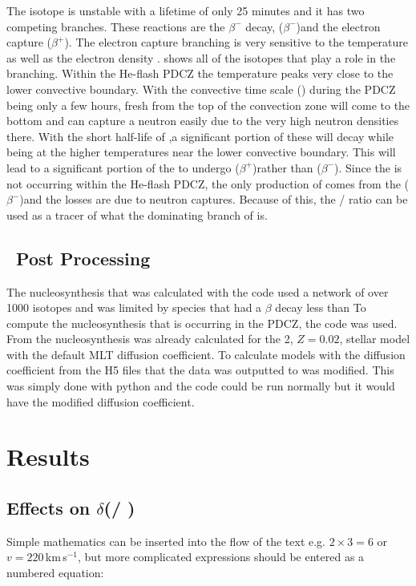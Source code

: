 \documentclass[fleqn,usenatbib]{mnras}
\begin{document}
The \iodine[128] isotope is unstable with a lifetime of only 25 minutes and it has two competing branches. These reactions are the $\beta^{-}$ decay, \iodine[128]($\beta^{-}$)\xenon[128] and the electron capture \iodine[128]($\beta^{+}$)\tellurium[128]. The electron capture branching is very sensitive to the temperature as well as the electron density \citep{reif}.  shows all of the isotopes that play a role in the \iodine[128] branching. Within the He-flash PDCZ the temperature peaks very close to the lower convective boundary. With the convective time scale () during the PDCZ being only a few hours, fresh \iodine[126] from the top of the convection zone will come to the bottom and can capture a neutron easily due to the very high neutron densities there. With the short half-life of \iodine[128],a significant portion of these will decay while being at the higher temperatures near the lower convective boundary. This will lead to a significant portion of the \iondine[128] to undergo \iodine[128]($\beta^{+}$)\tellurium[128] rather than \iodine[128]($\beta^{-}$)\xenon[128]. Since the \ppr is not occurring within the He-flash PDCZ, the only production of \xenon[128] comes from the \iodine[128]($\beta^{-}$)\xenon[128] and the losses are due to neutron captures. Because of this, the \xenon[128] / \xenon[130] ratio can be used as a tracer of what the dominating branch of \iodine[128] is.

\subsection{\mppnp~Post Processing}
\label{sec:mppnp}

The nucleosynthesis that was calculated with the \mppnp code used a network of over 1000 isotopes and was limited by species that had a $\beta$ decay less than 
To compute the nucleosynthesis that is occurring in the PDCZ, the \mppnp code was used. From \citep{models} the nucleosynthesis was already calculated for the 2\Msun, $Z=0.02$, stellar model with the default MLT diffusion coefficient. To calculate models with the diffusion coefficient from  the H5 files that the \MESA data was outputted to was modified. This was simply done with python and the \mppnp code could be run normally but it would have the modified diffusion coefficient.  
\section{Results}
\subsection{Effects on $\delta$(\zirconium[96] / \zirconium[94])}
\label{sec:zr_zr}
Simple mathematics can be inserted into the flow of the text e.g. $2\times3=6$
or $v=220$\,km\,s$^{-1}$, but more complicated expressions should be entered
as a numbered equation:
\end{document}
